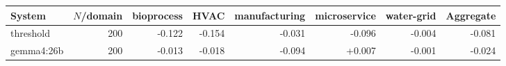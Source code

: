 \begin{tabular}{lrrrrrrr}
\toprule
System & $N$/domain & bioprocess & HVAC & manufacturing & microservice & water-grid & Aggregate \\
\midrule
threshold & 200 & -0.122 & -0.154 & -0.031 & -0.096 & -0.004 & -0.081 \\
gemma4:26b & 200 & -0.013 & -0.018 & -0.094 & +0.007 & -0.001 & -0.024 \\
\bottomrule
\end{tabular}
